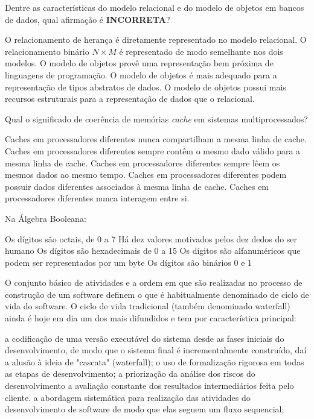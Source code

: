 \documentclass[12pt, addpoints]{exam}
\begin{document}
\begin{questions}
\question

Dentre as características do modelo relacional e do modelo de objetos em bancos de dados, qual afirmação é \textbf{INCORRETA}?


\begin{choices}
\choice O relacionamento de herança é diretamente representado no modelo relacional.
\choice O relacionamento binário \( N \times M \) é representado de modo semelhante nos dois modelos.	
\choice O modelo de objetos provê uma representação bem próxima de linguagens de programação.
\choice O modelo de objetos é mais adequado para a representação de tipos abstratos de dados.
\choice O modelo de objetos possui mais recursos estruturais para a representação de dados que o relacional.
\end{choices}

\question

Qual o significado de coerência de memórias \textit{cache} em sistemas multiprocessados?


\begin{choices}
\choice Caches em processadores diferentes nunca compartilham a mesma linha de cache.
\choice Caches em processadores diferentes sempre contêm o mesmo dado válido para a mesma linha de cache.
\choice Caches em processadores diferentes sempre lêem os mesmos dados ao mesmo tempo.
\choice Caches em processadores diferentes podem possuir dados diferentes associados à mesma linha de cache.
\choice Caches em processadores diferentes nunca interagem entre si.
\end{choices}

\question

Na Álgebra Booleana:
\begin{choices}
\choice Os dígitos são octais, de 0 a 7
\choice Há dez valores motivados pelos dez dedos do ser humano
\choice Os dígitos são hexadecimais de 0 a 15
\choice Os dígitos são alfanuméricos que podem ser representados por um byte
\choice Os dígitos são binários 0 e 1
\end{choices}

\question

O conjunto básico de atividades e a ordem em que são realizadas no processo de construção de um software definem o que é habitualmente denominado de ciclo de vida do software. O ciclo de vida tradicional (também denominado waterfall) ainda é hoje em dia um dos mais difundidos e tem por característica principal: 
\begin{choices}
\choice a codificação de uma versão executável do sistema desde as fases iniciais do desenvolvimento, de modo que o sistema final é incrementalmente construído, daí a alusão à ideia de "cascata" (waterfall); 
\choice o uso de formalização rigorosa em todas as etapas de desenvolvimento; 
\choice a priorização da análise dos riscos do desenvolvimento
\choice a avaliação constante dos resultados intermediários feita pelo cliente.
\choice a abordagem sistemática para realização das atividades do desenvolvimento de software de modo que elas seguem um fluxo sequencial; 
\end{choices}


\end{questions}
\end{document}

